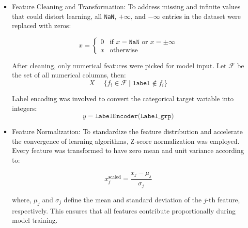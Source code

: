 \documentclass[conference]{IEEEtran}
\begin{document}
\begin{itemize}
The minority class size was used to determine the maximum class size, $C_{max}$, to that value.  According to Algorithm~\ref{alg:undersampling}, each class was randomly sampled to match $C_{max}$.
\begin{algorithm}[h]
\caption{Undersampling Strategy for Class Balancing}
\label{alg:undersampling}

$C_{\text{max}} \gets \min_{i} |C_i|$\;
$D_{\text{balanced}} \gets \emptyset$\;

\end{algorithm}

\item Feature Cleaning and Transformation: To address missing and infinite values that could distort learning, all \texttt{NaN}, \(+\infty\), and \(-\infty\) entries in the dataset were replaced with zeros:

\begin{equation}
   x = 
\begin{cases}
0 & \text{if } x = \texttt{NaN} \text{ or } x = \pm\infty \\
x & \text{otherwise}
\end{cases} 
\end{equation}

After cleaning, only numerical features were picked for model input. Let \( \mathcal{F} \) be the set of all numerical columns, then:
\begin{equation}
    X = \{ f_i \in \mathcal{F} \mid \texttt{label} \notin f_i \}
\end{equation}

Label encoding was involved to convert the categorical target variable into integers:
\begin{equation}
    y = \texttt{LabelEncoder(Label\_grp)}
\end{equation}

\item Feature Normalization: To standardize the feature distribution and accelerate the convergence of learning algorithms, Z-score normalization was employed. Every feature was transformed to have zero mean and unit variance according to:

\begin{equation}
    x_j^{\text{scaled}} = \frac{x_j - \mu_j}{\sigma_j}
\end{equation}

where, \( \mu_j \) and \( \sigma_j \) define the mean and standard deviation of the \( j \)-th feature, respectively. This ensures that all features contribute proportionally during model training.

\end{itemize}
\end{document}
